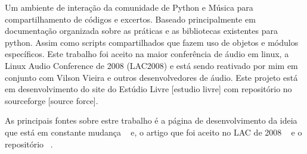 Um ambiente de interação da comunidade de Python e Música 
para compartilhamento de códigos e excertos. Baseado principalmente
em documentação organizada sobre as práticas e as bibliotecas
existentes para python. Assim como scripts compartilhados que
fazem uso de objetos e módulos específicos. Este trabalho foi aceito na
maior conferência de áudio em linux, a Linux Audio Conference de 2008
(LAC2008) e está sendo reativado por mim em conjunto com Vilson Vieira
e outros desenvolvedores de áudio. Este projeto está em desenvolvimento
do site do Estúdio Livre [estudio livre] com repositório no sourceforge [source force].

As principais fontes sobre estre trabalho é a página de desenvolvimento da ideia
que está em constante mudança ~\cite{http://estudiolivre.org/tiki-index.php?page=fdp&highlight=fdp fdpel}
e, o artigo que foi aceito no LAC de 2008 ~\cite{http://www.estudiolivre.org/el-gallery_view.php?arquivoId=8221 fdplac2008}
e o repositório ~\cite{http://sourceforge.net/projects/fdpack/develop fdpsf}.